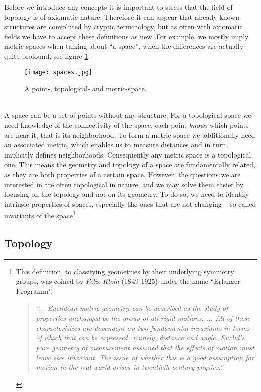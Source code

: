 Before we introduce any concepts it is important to stress that the field of topology is of axiomatic nature.
Therefore it can appear that already known structures are convoluted by cryptic terminology, but as often with axiomatic fields we have to accept these definitions as new.
For example, we mostly imply metric spaces when talking about ``a space'', when the differences are actually quite profound, see figure \ref{fig:spaces}:
\begin{figure}[ht]
\centering
\texttt{[image: spaces.jpg]}
\caption{A point-, topological- and metric-space.}
\label{fig:spaces}
\end{figure}\\
A space can be a set of points without any structure.
For a topological space we need knowledge of the connectivity of the space, each point \textit{knows} which points are near it, that is its neighborhood.
To form a metric space we additionally need an associated metric, which enables us to measure distances and in turn, implicitly
defines neighborhoods.
Consequently any metric space is a topological one.
This means the geometry and topology of a space are fundamentally related, as they are both properties of a certain space.
However, the questions we are interested in are often topological in nature, and we may solve them easier by focusing on the topology and not on its geometry.
To do so, we need to identify intrinsic properties of spaces, especially the ones that are not changing -- so called invariants of the space\footnote{ This definition, to classifying geometries by their underlying symmetry groups, was coined by \textit{Felix Klein} (1849-1925) under the name ``Erlanger Programm''.
\begin{quote} \textit{``... Euclidean metric geometry can be described as the study of properties unchanged be the group of all rigid motions. ... All of these characteristics are dependent on two fundamental invariants in terms of which that can be expressed, namely, distance and angle. Euclid's pure geometry of measurement assumed that the effects of motion must leave size invariant. The issue of whether this is a good assumption for motion in the real world arises in twentieth-century physics.''} \citep[p.405]{Kramer1982} \end{quote}
} \citep[][cf. pp.1-5]{Zomorodian1996}.

\subsection{Topology}
\label{math_topology}

